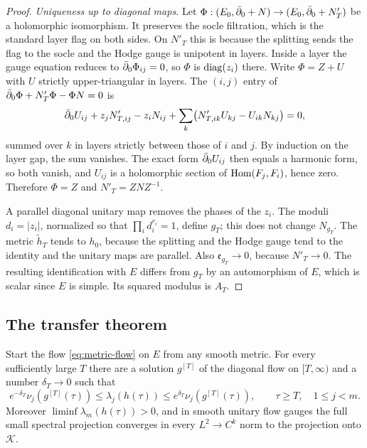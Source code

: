 \begin{proof}
\emph{Uniqueness up to diagonal maps.} Let
$\Phi:(E_0,\bar\partial_0+N)\to(E_0,\bar\partial_0+N'_T)$ be a holomorphic isomorphism. It
preserves the socle filtration, which is the standard layer flag on both
sides. On $N'_T$ this is because the splitting sends the flag to the socle
and the Hodge gauge is unipotent in layers. Inside a layer the gauge
equation reduces to $\bar\partial_0\Phi_{ij}=0$, so $\Phi$ is $\operatorname{diag}(z_i)$ there.
Write $\Phi=Z+U$ with $U$ strictly upper-triangular in layers. The
$(i,j)$ entry of $\bar\partial_0\Phi+N'_T\Phi-\Phi N=0$ is
\[
 \bar\partial_0U_{ij}+z_jN'_{T,ij}-z_iN_{ij}
 +\sum_{k}\bigl(N'_{T,ik}U_{kj}-U_{ik}N_{kj}\bigr)=0,
\]
summed over $k$ in layers strictly between those of $i$ and $j$. By
induction on the layer gap, the sum vanishes. The exact form
$\bar\partial_0U_{ij}$ then equals a harmonic form, so both vanish, and $U_{ij}$ is
a holomorphic section of $\operatorname{Hom}(F_j,F_i)$, hence zero. Therefore $\Phi=Z$
and $N'_T=ZNZ^{-1}$.

A parallel diagonal unitary map removes the phases of the $z_i$. The
moduli $d_i=|z_i|$, normalized so that $\prod_id_i^{r_i}=1$, define $g_T$;
this does not change $N_{g_T}$. The metric $\widetilde h_T$ tends to $h_0$,
because the splitting and the Hodge gauge tend to the identity and the
unitary maps are parallel. Also $\mathfrak e_{g_T}\to0$, because $N'_T\to0$. The
resulting identification with $E$ differs from $g_T$ by an automorphism of
$E$, which is scalar since $E$ is simple. Its squared modulus is $A_T$.
\end{proof}

\subsection{The transfer theorem}

\begin{theorem}\label{thm:transfer}
Start the flow \eqref{eq:metric-flow} on $E$ from any smooth metric. For
every sufficiently large $T$ there are a solution $g^{[T]}$ of the diagonal
flow on $[T,\infty)$ and a number $\delta_T\to0$ such that
\begin{equation}\label{eq:transfer}
 e^{-\delta_T}\nu_j(g^{[T]}(\tau))\le\lambda_j(h(\tau))
 \le e^{\delta_T}\nu_j(g^{[T]}(\tau)),\qquad\tau\ge T,\quad1\le j<m.
\end{equation}
Moreover $\liminf\lambda_m(h(\tau))>0$, and in smooth unitary flow gauges
the full small spectral projection converges in every $L^2\to C^k$ norm to
the projection onto $\mathcal K$.
\end{theorem}

